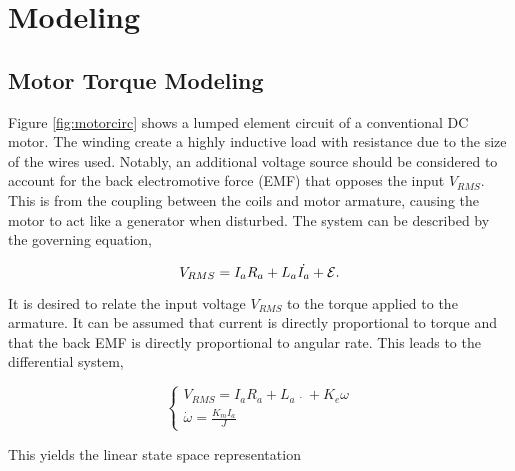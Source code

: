 \chapter{Modeling}

\section{Motor Torque Modeling}

Figure \ref{fig:motorcirc} shows a lumped element circuit of a conventional DC motor. The winding create a highly inductive load with resistance due to the size of the wires used. Notably, an additional voltage source should be considered to account for the back electromotive force (EMF)  that opposes the input $V_{RMS}$. This is from the coupling between the coils and motor armature, causing the motor to act like a generator when disturbed. The system can be described by the governing equation,

\begin{equation}
    V_{RMS} = I_a R_a + L_a \dot{I_a} + {\mathcal E}.
\end{equation}

It is desired to relate the input voltage $V_{RMS}$ to the torque applied to the armature. It can be assumed that current is directly proportional to torque and that the back EMF is directly proportional to angular rate. This leads to the differential system,

\begin{equation}
    \left\{ {\begin{array}{*{20}{c}}
  {{V_{RMS}} = {I_a}{R_a} + {L_a}\mathop {{I_a}}\limits^.  + {K_e}\omega } \\ 
  {\dot \omega  = \frac{{{K_m}{I_a}}}{J}} 
\end{array}} \right.
\end{equation}

This yields the linear state space representation

